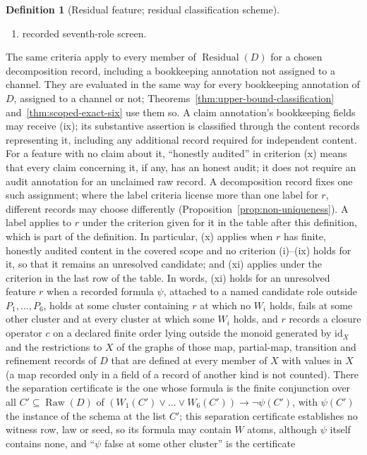 \documentclass[11pt]{article}
\theoremstyle{definition}
\newtheorem{definition}[theorem]{Definition}
\newcommand{\Raw}[1]{\ensuremath{\operatorname{Raw}\!\left(#1\right)}}
\newcommand{\Residual}[1]{\ensuremath{\operatorname{Residual}\!\left(#1\right)}}
\begin{document}
\begin{definition}[Residual feature; residual classification scheme]
\begin{enumerate}[label=(\roman*),topsep=2pt,itemsep=1pt]
  \item recorded seventh-role screen.
\end{enumerate}
The same criteria apply to every member of \(\Residual{D}\) for a chosen
decomposition record, including a bookkeeping annotation not assigned to a
channel. They are evaluated in the same way for every bookkeeping annotation of \(D\), assigned to a channel or not; Theorems~\ref{thm:upper-bound-classification} and~\ref{thm:scoped-exact-six} use them so. A claim annotation's bookkeeping fields may receive (ix); its substantive
assertion is classified through the content records representing it,
including any additional record required for independent content. For a feature with no claim about it, ``honestly audited'' in
criterion (x) means that every claim concerning it, if any, has an honest
audit; it does not require an audit annotation for an unclaimed raw record.
A decomposition record fixes one such assignment; where the label criteria
license more than one label for \(r\), different records may choose
differently (Proposition~\ref{prop:non-uniqueness}). A label applies to \(r\) under the criterion given for it in the table
after this definition, which is part of the definition. In particular,
(x) applies when \(r\) has finite, honestly audited content in the covered scope and
no criterion (i)--(ix) holds for it, so that it remains an unresolved
candidate; and (xi) applies under the criterion in the last row of the table. In words, (xi)
holds for an unresolved feature \(r\) when a recorded formula \(\psi\), attached
to a named candidate role outside \(P_1,\dots,P_6\), holds at some cluster
containing \(r\) at which no \(W_i\) holds, fails at some other cluster and at
every cluster at which some \(W_i\) holds, and \(r\) records a closure operator \(c\) on
a declared finite order lying outside the monoid generated by \(\mathrm{id}_X\) and the restrictions to \(X\) of the graphs of those map, partial-map, transition and refinement records of
\(D\) that are defined at every member of \(X\) with values in \(X\) (a map recorded only in a field of a record of another kind is not counted). There the
separation certificate is the one whose formula is the finite conjunction over
all \(C'\subseteq\Raw{D}\) of
\((W_1(C')\vee\dots\vee W_6(C'))\rightarrow\neg\psi(C')\), with \(\psi(C')\) the
instance of the schema at the list \(C'\); this separation certificate
establishes no witness row, law or seed, so its formula may contain \(W\)
atoms, although \(\psi\) itself contains none, and ``\(\psi\) false at some other cluster'' is the certificate

\end{definition}
\end{document}
